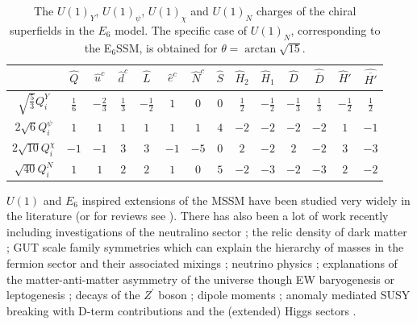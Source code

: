 \documentclass[preprint,amsmath,amssymb,aps,superscriptaddress,prd,
showpacs,floatfix,nofootinbib]{revtex4-1}
\begin{document}
\begin{table}[h]
\centering
\begin{ruledtabular}
\begin{tabular}{cccccccccccccc}
 & $\hat{Q}$ & $\hat{u}^c$ & $\hat{d}^c$ & $\hat{L}$ & $\hat{e}^c$ &
$\hat{N}^c$ & $\hat{S}$ & $\hat{H}_2$ & $\hat{H}_1$ & $\hat{D}$ &
$\hat{\overline{D}}$ & $\hat{H}'$ & $\hat{\overline{H'}}$ \\[1mm]
\hline
$\sqrt{\frac{5}{3}}Q_i^Y$ & $\frac{1}{6}$ & $-\frac{2}{3}$ & $\frac{1}{3}$ &
$-\frac{1}{2}$ & $1$ & $0$ & $0$ & $\frac{1}{2}$ & $-\frac{1}{2}$ &
$-\frac{1}{3}$ & $\frac{1}{3}$ & $-\frac{1}{2}$ & $\frac{1}{2}$ \\[1mm]
$2\sqrt{6}Q_i^\psi$ & $1$ & $1$ & $1$ & $1$ & $1$ & $1$ & $4$ & $-2$ & $-2$ &
$-2$ & $-2$ & $1$ & $-1$\\[1mm]
$2\sqrt{10}Q_i^\chi$ & $-1$ & $-1$ & $3$ & $3$ & $-1$ & $-5$ & $0$ & $2$ &
$-2$ & $2$ & $-2$ & $3$ & $-3$\\[1mm]
$\sqrt{40}Q_i^N$ & $1$ & $1$ & $2$ & $2$ & $1$ & $0$ & $5$ & $-2$ & $-3$ &
$-2$ & $-3$ & $2$ & $-2$ \\[1mm]
\end{tabular}
\end{ruledtabular}
\caption{The $U(1)_Y$, $U(1)_\psi$, $U(1)_\chi$ and $U(1)_N$ charges of the
chiral superfields in the $E_6$ model.  The specific case of $U(1)_N$,
corresponding to the E$_6$SSM, is obtained for $\theta = \arctan \sqrt{15}$.}
\label{tab:E6charges}
\end{table}


$U(1)$ and $E_6$ inspired extensions of the MSSM have been studied
very widely in the literature \cite{Gunion:1989we, Gunion:1992hs,
Binetruy:1985xm, Ellis:1986yg, Ibanez:1986si, Gunion:1986ky,
Haber:1986gz, Baer:1987eb, Gunion:1987jd, Grifols:1986vr,
Ellis:1986ip, Morris:1987fm, Drees:1987tp, Ma:1995xk,
Suematsu:1997tv, Suematsu:1997qt, Suematsu:1997au, Keith:1996fv,
Keith:1997zb, Gherghetta:1996yr, Demir:1998dk, Langacker:1998tc,
Hambye:2000bn, Ma:2000jf} (or for reviews see \cite{Hewett:1988xc,
Langacker:2008yv}).  There has also been a lot of work recently including
investigations of the neutralino sector \cite{Hesselbach:2001ri,
Barger:2005hb, Choi:2006fz, Barger:2007nv}; the relic density of dark matter
\cite{Kalinowski:2008iq}; GUT scale family symmetries which can explain the
hierarchy of masses in the fermion sector and their associated mixings
\cite{Stech:2008wd}; neutrino physics \cite{Kang:2004ix}; explanations of
the matter-anti-matter asymmetry of the universe though EW baryogenesis or
leptogenesis \cite{Hambye:2000bn, Ma:2000jf, Kang:2004pp}; decays of the
$Z^\prime$ boson \cite{Kang:2004bz, Baumgart:2006pa, Athron:2011wu,
Chang:2011be}; dipole moments \cite{GutierrezRodriguez:2006hb}; anomaly
mediated SUSY breaking with D-term contributions \cite{Asano:2008ju} and
the (extended) Higgs sectors \cite{Daikoku:2000ep, Ham:2008xf}.
\end{document}
